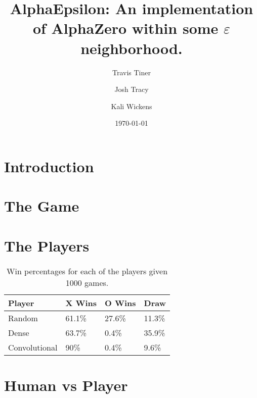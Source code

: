 \documentclass[11pt]{article}
\title{AlphaEpsilon: An implementation of AlphaZero within some $\varepsilon$ neighborhood.}
\author{Travis Tiner}
\author{Josh Tracy}
\author{Kali Wickens}
\affil{University of Utah -- Deep Learning}
\date{\today}
\begin{document}
\maketitle

\section{Introduction}

	

\section{The Game}

	

\section{The Players}
	
	
	
	
	

	\begin{table}[]
		\centering
		\begin{tabular}{llll}
		\hline
		\textbf{Player} & \textbf{X Wins} & \textbf{O Wins} & \textbf{Draw} \\ \hline
		Random          & 61.1\%          & 27.6\%          & 11.3\%        \\
		Dense           & 63.7\%          & 0.4\%           & 35.9\%        \\
		Convolutional   & 90\%            & 0.4\%           & 9.6\%         \\ \hline
		\end{tabular}
		\caption{Win percentages for each of the players given 1000 games.}
	\end{table}

	

\section{Human vs Player}

	

%
%
%
%
%
\end{document}
